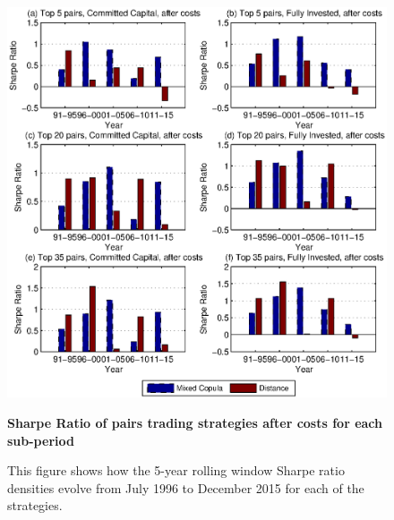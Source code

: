 \begin{figure}[!ht]
	\centering
		\includegraphics[width=\linewidth]{Figure7.eps}
	\captionsetup{justification=raggedright,
		singlelinecheck=false
	}
	\caption{\textbf{Sharpe Ratio of pairs trading strategies after costs for each sub-period}}
	\caption*{\scriptsize This figure shows how the 5-year rolling window Sharpe ratio densities evolve from July 1996 to December 2015 for each of the strategies.}
	\label{fig:Figure7}
\end{figure}

\vspace{1.0cm}
